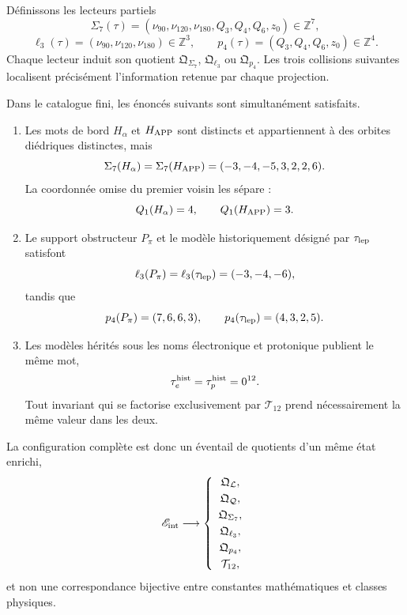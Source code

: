 Définissons les lecteurs partiels
\[
 \Sigma_7(\tau)=
 (\nu_{90},\nu_{120},\nu_{180},Q_3,Q_4,Q_6,z_0)
 \in\mathbb Z^7,
\]
\[
 \ell_3(\tau)=(\nu_{90},\nu_{120},\nu_{180})\in\mathbb Z^3,
 \qquad
 p_4(\tau)=(Q_3,Q_4,Q_6,z_0)\in\mathbb Z^4.
\]
Chaque lecteur induit son quotient \(\mathfrak Q_{\Sigma_7}\),
\(\mathfrak Q_{\ell_3}\) ou \(\mathfrak Q_{p_4}\). Les trois collisions
suivantes localisent précisément l'information retenue par chaque projection.

\begin{theorem}
\label{thm:configuracion-cocientes-conjugados-rev11}
Dans le catalogue fini, les énoncés suivants sont simultanément satisfaits.
\begin{enumerate}[label=\textup{(\roman*)},leftmargin=2.2em]
 \item Les mots de bord \(H_\alpha\) et \(H_{\rm APP}\) sont distincts
 et appartiennent à des orbites diédriques distinctes, mais
 \[
  \Sigma_7(H_\alpha)=\Sigma_7(H_{\rm APP})
  =(-3,-4,-5,3,2,2,6).
 \]
 La coordonnée omise du premier voisin les sépare :
 \[
  Q_1(H_\alpha)=4,
  \qquad Q_1(H_{\rm APP})=3.
 \]

 \item Le support obstructeur \(P_\pi\) et le modèle historiquement
 désigné par \(\tau_{\rm lep}\) satisfont
 \[
  \ell_3(P_\pi)=\ell_3(\tau_{\rm lep})=(-3,-4,-6),
 \]
 tandis que
 \[
  p_4(P_\pi)=(7,6,6,3),
  \qquad p_4(\tau_{\rm lep})=(4,3,2,5).
 \]

 \item Les modèles hérités sous les noms électronique et protonique
 publient le même mot,
 \[
  \tau_e^{\rm hist}=\tau_p^{\rm hist}=0^{12}.
 \]
 Tout invariant qui se factorise exclusivement par
 \(\mathcal T_{12}\) prend nécessairement la même valeur dans les deux.
\end{enumerate}
La configuration complète est donc un éventail de quotients d'un même
état enrichi,
\begin{equation}
 \mathscr E_{\rm int}
 \longrightarrow
 \left\{
 \begin{array}{c}
  \mathfrak Q_{\mathcal L},\\[1mm]
  \mathfrak Q_{\mathcal Q},\\[1mm]
  \mathfrak Q_{\Sigma_7},\\[1mm]
  \mathfrak Q_{\ell_3},\\[1mm]
  \mathfrak Q_{p_4},\\[1mm]
  \mathcal T_{12},
 \end{array}
 \right.
 \label{eq:abanico-cocientes-rev11}
\end{equation}
et non une correspondance bijective entre constantes mathématiques et classes
physiques.
\end{theorem}

